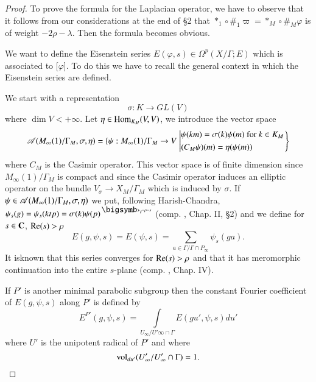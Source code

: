 \begin{proof}
To prove the formula for the Laplacian operator, we have to observe that it follows from our considerations at the end of \S 2 that $\ast_1 \circ \#_1 \varpi = \ast_M \circ \#_M \varphi$ is of weight $-2 \rho - \lambda$. Then the formula becomes obvious. 

We want to define the Eisenstein series $E(\varphi, s) \in \Omega^p (X/ \Gamma ; E)$ which is associated to [$\varphi$]. To do this we have to recall the general context in which the Eisenstein series are defined.

We start with a representation
$$
\sigma : K \longrightarrow G L (V)
$$
where $\dim V < + \infty$. Let $\eta  \in \operatorname{Hom}_{K_M} (V, V)$, we introduce the vector space
{\fontsize{10}{12}
$$
\mathscr{A} (M_\infty (1) / \Gamma_M , \sigma, \eta) = \{\psi: M_\infty (1)/ \Gamma_M \to V
\left.
\left|
\begin{aligned}
&\psi(km) = \sigma (k) \psi (m) \text{ for } k \in K_M\\
&(C_M \psi) (m) = \eta (\psi (m))
\end{aligned}
\right.
\right\}
$$}
where $C_M$ is the Casimir operator. This vector space is of finite dimension since $M_\infty (1)/ \Gamma _M$ is compact and since the Casimir operator induces an elliptic operator on the bundle $V_\sigma \to X_M / \Gamma_M$ which is induced by $\sigma$. If $\psi \in \mathscr{A}(M_\infty (1)/\Gamma_M, \sigma, \eta)$ we put, following Harish-Chandra, $\psi_s (g) = \psi_s (ktp) =\sigma (k) \psi (p)^{\bigdot t ^{-\rho - s}}$ (comp. \cite{art5-key7}, Chap. II, \S 2) and we define for $s \in \mathbf{C}$, $\operatorname{Re} (s) > \rho$
$$
E (g, \psi, s) = E (\psi, s) = \sum\limits_{a \in \Gamma / \Gamma \cap P_\infty} \psi_s (ga).
$$
It is\pageoriginale known that this series converges for $\operatorname{Re} (s) > \rho$ and that it has meromorphic continuation into the entire $s$-plane (comp. \cite{art5-key8}, Chap. IV).

If $P'$ is another minimal parabolic subgroup then the constant Fourier coefficient of $E(g, \psi, s)$ along $P'$ is defined by 
$$
E^{P'} (g,\psi, s) = \int\limits_{U_\infty / U' \infty \cap \Gamma} E (gu', \psi, s) d u'
$$
where $U'$ is the unipotent radical of $P'$ and where
$$
\operatorname{vol}_{du'} (U'_\infty/ U'_\infty \cap \Gamma) =1.
$$


\end{proof}
